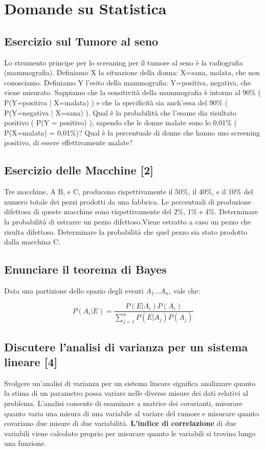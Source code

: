 \documentclass[\main/main.tex]{subfiles}
\begin{document}
\section{Domande su Statistica}


\subsection{Esercizio sul Tumore al seno}
Lo strumento principe per lo screaning per il tumore al seno è la radiografia (mammografia). Definiamo X la situazione della donna: X={sana, malata}, che non conosciamo. Definiamo Y l'esito della mammografia: Y={positiva, negativa}, che viene misurato. Sappiamo che la sensitività della mammografia è intorno al 90\% ( P(Y=positiva | X=malata) ) e che la specificità sia anch'essa del 90\% ( P(Y=negativa | X=sana) ). Qual è la probabilità che l'esame dia risultato positivo ( P(Y = positivo) ), sapendo che le donne malate sono lo 0,01\% ( P(X=malata) = 0,01\%)? Qual è la percentuale di donne che hanno uno screening positivo, di essere effettivamente malate?

\subsection{Esercizio delle Macchine [2]}
Tre macchine, A B, e C, producono rispettivamente il 50\%, il 40\%, e il 10\% del numero totale dei pezzi prodotti da una fabbrica. Le percentuali di produzione difettosa di queste macchine sono rispettivamente del 2\%, 1\% e 4\%. Determinare la probabilità di estrarre un pezzo difettoso.Viene estratto a caso un pezzo che risulta difettoso. Determinare la probabilità che quel pezzo sia stato prodotto dalla macchina C.

\subsection{Enunciare il teorema di Bayes}
Data una partizione dello spazio degli eventi $A_1...A_n$, vale che:

\[
	P(A_i|E) = \dfrac{P(E|A_i)P(A_i)}{\sum_{j=1}^n P(E|A_j)P(A_j)}
\]

\subsection{Discutere l'analisi di varianza per un sistema lineare [4]}
Svolgere un'analisi di varianza per un sistema lineare significa analizzare quanto la stima di un parametro possa variare nelle diverse misure dei dati relativi al problema.
L'analisi consente di esaminare a matrice dei covarianti, misurare quanto varia una misura di una variabile al variare del rumore e misurare quanto covariano due misure di due variabilità.
\textbf{L'indice di correlazione} di due variabili viene calcolato proprio per misurare quanto le variabili si trovino lungo una funzione.
\end{document}
